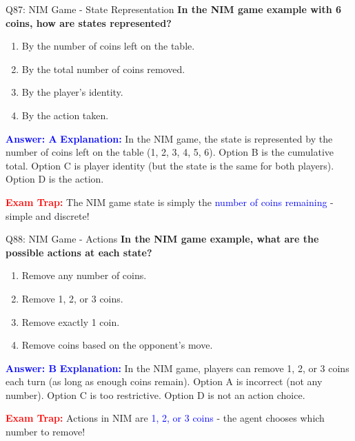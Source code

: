 \documentclass[8pt]{beamer}
\begin{document}
	\begin{frame}{Q87: NIM Game - State Representation}
		\fontsize{6.5}{7.5}\selectfont
		\textbf{In the NIM game example with 6 coins, how are states represented?}
		
		\begin{enumerate}
			\item By the number of coins left on the table.
			\item By the total number of coins removed.
			\item By the player's identity.
			\item By the action taken.
		\end{enumerate}
		
		\vspace{0.1cm}
		\textcolor{blue}{\textbf{Answer: A}}
		\vspace{0.1cm}
		\textcolor{blue}{\textbf{Explanation:}} In the NIM game, the state is represented by the number of coins left on the table (1, 2, 3, 4, 5, 6). Option B is the cumulative total. Option C is player identity (but the state is the same for both players). Option D is the action.
		
		\textcolor{red}{\textbf{Exam Trap:}} The NIM game state is simply the \textcolor{blue}{number of coins remaining} - simple and discrete!
	\end{frame}
	
	\begin{frame}{Q88: NIM Game - Actions}
		\fontsize{6.5}{7.5}\selectfont
		\textbf{In the NIM game example, what are the possible actions at each state?}
		
		\begin{enumerate}
			\item Remove any number of coins.
			\item Remove 1, 2, or 3 coins.
			\item Remove exactly 1 coin.
			\item Remove coins based on the opponent's move.
		\end{enumerate}
		
		\vspace{0.1cm}
		\textcolor{blue}{\textbf{Answer: B}}
		\vspace{0.1cm}
		\textcolor{blue}{\textbf{Explanation:}} In the NIM game, players can remove 1, 2, or 3 coins each turn (as long as enough coins remain). Option A is incorrect (not any number). Option C is too restrictive. Option D is not an action choice.
		
		\textcolor{red}{\textbf{Exam Trap:}} Actions in NIM are \textcolor{blue}{1, 2, or 3 coins} - the agent chooses which number to remove!
	\end{frame}
	
\end{document}
